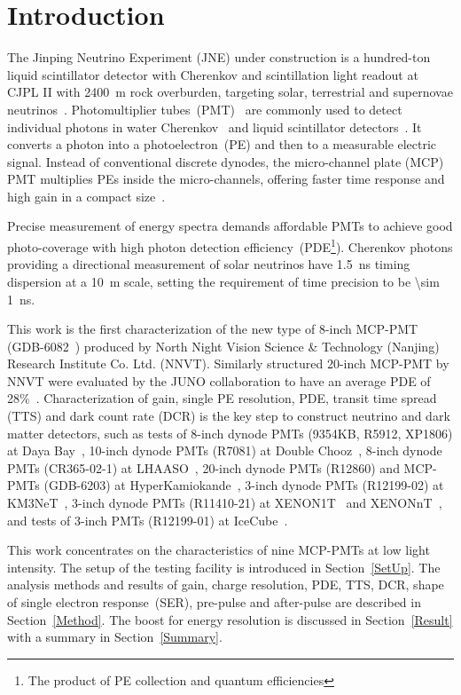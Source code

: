 \section{Introduction}
The Jinping Neutrino Experiment (JNE) under construction is a hundred-ton liquid scintillator detector with Cherenkov and scintillation light readout
 at CJPL II with \SI{2400}{m} rock overburden, targeting solar, terrestrial and supernovae neutrinos~\cite{LetterJNE2017,xu_jinping_2020,xu_innovations_2022,xu_design_2022}.
Photomultiplier tubes~(PMT)~\cite{HAMAMATSUManual} are commonly used to detect individual photons in water Cherenkov~\cite{SNO,SuperK} and liquid scintillator detectors~\cite{KamLAND,JUNO:2015zny}. It converts a photon into a photoelectron~(PE) and then to a measurable electric signal.  Instead of conventional discrete dynodes, the micro-channel plate (MCP) PMT multiplies PEs inside the micro-channels, offering faster time response and high gain in a compact size~\cite{WANG2012113,MCP-PMTworkgroup:2021hoy,HAMAMATSUManual}.

Precise measurement of energy spectra demands affordable PMTs to achieve good photo-coverage with high photon detection efficiency~(PDE\footnote{The product of PE collection and quantum efficiencies}). Cherenkov photons providing a directional measurement of solar neutrinos have \SI{1.5}{ns} timing dispersion at a \SI{10}{m} scale, setting the requirement of time precision to be \SI{\sim 1}{ns}.


This work is the first characterization of
 the new type of 8-inch MCP-PMT (GDB-6082~\cite{GDB-6082}) produced by North Night Vision Science \& Technology (Nanjing) Research Institute Co. Ltd. (NNVT). %
Similarly structured 20-inch MCP-PMT by NNVT were evaluated by the JUNO collaboration to have an average PDE of 28\%~\cite{JUNOMassTesting}.
Characterization of gain, single PE resolution, PDE, transit time spread (TTS) and dark count rate (DCR) is the key step to construct neutrino and dark matter detectors, such as tests of
 8-inch dynode PMTs (9354KB, R5912, XP1806) at Daya Bay~\cite{DayaBayTesting}, 10-inch dynode PMTs (R7081) at Double Chooz~\cite{DoubleChoozeTesting}, 8-inch dynode PMTs (CR365-02-1) at LHAASO~\cite{LHAASOTesting}, 20-inch dynode PMTs (R12860) and MCP-PMTs (GDB-6203) at HyperKamiokande~\cite{HyperKTesting}, 3-inch dynode PMTs (R12199-02) at KM3NeT~\cite{KM3NetTesting}, 3-inch dynode PMTs (R11410-21) at XENON1T~\cite{XENON1TTesting} and XENONnT~\cite{XENONnTTesting}, and tests of 3-inch PMTs (R12199-01) at IceCube~\cite{IceCubeTesting}.

This work concentrates on the characteristics of nine MCP-PMTs at low light intensity. The setup of the testing facility is introduced in Section~\ref{SetUp}. The analysis methods and results of gain, charge resolution, PDE, TTS, DCR, shape of single electron response~(SER), pre-pulse and after-pulse are described in Section~\ref{Method}. The boost for energy resolution is discussed in Section~\ref{Result} with a summary in Section~\ref{Summary}.
